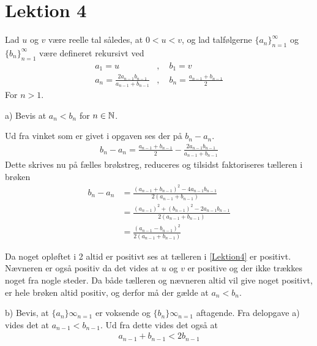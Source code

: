 \chapter{Lektion 4}
Lad $u$ og $v$ være reelle tal således, at $0<u<v$, og lad talfølgerne $\{a_n\}^\infty_{n=1}$ og $\{b_n\}^\infty_{n=1}$ være defineret rekursivt ved
\begin{align*}
    a_1 = u&, \quad b_1=v\\
    a_n = \frac{2a_{n-1}b_{n-1}}{a_{n-1}+b_{n-1}}&, \quad b_n = \frac{a_{n-1}+b_{n-1}}{2} 
\end{align*}
For $n>1$.

a) Bevis at $a_n < b_n$ for $n \in \mathbb{N}$. 
\begin{bev} \textbf{} %
\newline
Ud fra vinket som er givet i opgaven ses der på $b_n-a_n$.
\begin{align*}
    b_n-a_n = \frac{a_{n-1}+b_{n-1}}{2} - \frac{2a_{n-1}b_{n-1}}{a_{n-1}+b_{n-1}}
\end{align*}
Dette skrives nu på fælles brøkstreg, reduceres og tilsidst faktoriseres tælleren i brøken
\begin{align}
     b_n-a_n &= \frac{(a_{n-1}+b_{n-1})^2-4a_{n-1}b_{n-1}}{2(a_{n-1}+b_{n-1})} \nonumber \\
     &= \frac{(a_{n-1})^2+(b_{n-1})^2-2a_{n-1}b_{n-1}}{2(a_{n-1}+b_{n-1})} \nonumber \\
     &= \frac{(a_{n-1}-b_{n-1})^2}{2(a_{n-1}+b_{n-1})}\label{Lektion4}
\end{align}

Da noget opløftet i 2 altid er positivt ses at tælleren i \eqref{Lektion4} er positivt. Nævneren er også positiv da det vides at $u$ og $v$ er positive og der ikke trækkes noget fra nogle steder. Da både tælleren og nævneren altid vil give noget positivt, er hele brøken altid positiv, og derfor må der gælde at $a_n < b_n$.
\end{bev}

b) Bevis, at $\{a_n\}\infty_{n=1}$ er voksende og $\{b_n\}\infty_{n=1}$ aftagende.
Fra delopgave a) vides det at $a_{n-1} < b_{n-1}$. Ud fra dette vides det også at 
\begin{align}\label{lektion4_2}
    a_{n-1}+b_{n-1} < 2b_{n-1}
\end{align}

